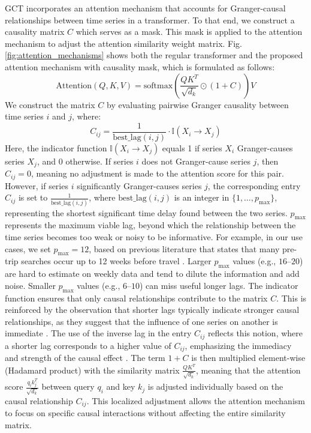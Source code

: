 \documentclass[acmsmall]{acmart}
\begin{document}
GCT incorporates an attention mechanism that accounts for Granger-causal relationships between time series in a transformer. To that end, we construct a causality matrix $C$ which serves as a mask. This mask is applied to the attention mechanism to adjust the attention similarity weight matrix. Fig. \ref{fig:attention_mechanisms} shows both the regular transformer and the proposed attention mechanism with causality mask, which is formulated as follows:
\begin{equation} \label{eq:equation_attention}
    \text{Attention}(Q,K,V) = \text{softmax}\left(\frac{QK^T}{\sqrt{d_k}} \odot (1 + C)\right)V
\end{equation}
We construct the matrix $C$ by evaluating pairwise Granger causality between time series $i$ and $j$, where:
\begin{equation}
C_{ij} = \frac{1}{\text{best\_lag}(i,j)} \cdot \mathbb{I}(X_i \rightarrow X_j)
\end{equation}
Here, the indicator function $\mathbb{I}(X_i \rightarrow X_j)$ equals 1 if series $X_i$ Granger-causes series $X_j$, and 0 otherwise. If series $i$ does not Granger-cause series $j$, then $C_{ij} = 0$, meaning no adjustment is made to the attention score for this pair. However, if series $i$ significantly Granger-causes series $j$, the corresponding entry $C_{ij}$ is set to $\frac{1}{\text{best\_lag}(i,j)}$, where $\text{best\_lag}(i,j)$ is {\color{black} an integer in $\{1,\dots,p_{\max}\}$, representing} the shortest significant time delay found between the two series. {\color{black}$p_{\max}$ represents the maximum viable lag, beyond which the relationship between the time series becomes too weak or noisy to be informative. For example, in our use cases, we set $p_{\max}=12$, based on previous literature that states that many pre-trip searches occur up to 12 weeks before travel \cite{claude2020predicting,bangwayo2015can}. Larger $p_{\max}$ values (e.g., $16$--$20$) are hard to estimate on weekly data and tend to dilute the information and add noise. Smaller $p_{\max}$ values (e.g., $6$--$10$) can miss useful longer lags.} The indicator function ensures that only causal relationships contribute to the matrix $C$. This is reinforced by the observation that shorter lags typically indicate stronger causal relationships, as they suggest that the influence of one series on another is immediate \cite{gunther2022reconstruction}. The use of the inverse lag in the entry $C_{ij}$ reflects this notion, where a shorter lag corresponds to a higher value of $C_{ij}$, emphasizing the immediacy and strength of the causal effect \cite{peng2020dli}. The term $1 + C$ is then multiplied element-wise (Hadamard product) with the similarity matrix $\frac{QK^T}{\sqrt{d_k}}$, meaning that the attention score $\frac{q_i k_j^T}{\sqrt{d_k}}$ between query $q_i$ and key $k_j$ is adjusted individually based on the causal relationship $C_{ij}$. This localized adjustment allows the attention mechanism to focus on specific causal interactions without affecting the entire similarity matrix.
\end{document}

